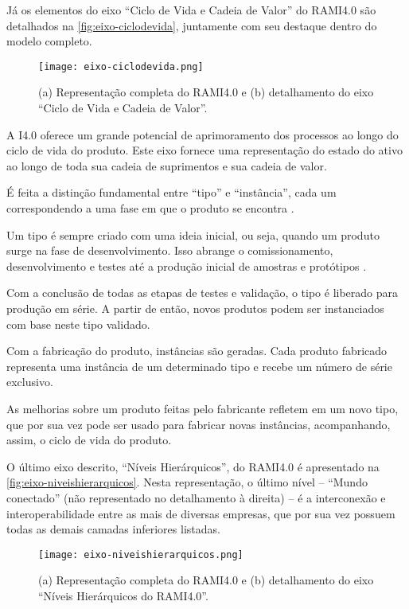 	Já os elementos do eixo ``Ciclo de Vida e Cadeia de Valor'' do RAMI4.0 são detalhados na \autoref{fig:eixo-ciclodevida}, juntamente com seu destaque dentro do modelo completo.
	
	\begin{figure}[htb]
		\centering
		\caption{(a) Representação completa do RAMI4.0 e (b) detalhamento do eixo ``Ciclo de Vida e Cadeia de Valor''.}
		\label{fig:eixo-ciclodevida}
		\texttt{[image: eixo-ciclodevida.png]}
	\end{figure}

	A I4.0 oferece um grande potencial de aprimoramento dos processos ao longo do ciclo de vida do produto. Este eixo fornece uma representação do estado do ativo ao longo de toda sua cadeia de suprimentos e sua cadeia de valor. 
	
	É feita a distinção fundamental entre ``tipo'' e ``instância'', cada um correspondendo a uma fase em que o produto se encontra \cite{adolphs2015rami}.
	
	Um tipo é sempre criado com uma ideia inicial, ou seja, quando um produto surge na fase de desenvolvimento. Isso abrange o comissionamento, desenvolvimento e testes até a produção inicial de amostras e protótipos \cite{adolph2018roadmap}. 
	
	Com a conclusão de todas as etapas de testes e validação, o tipo é liberado para produção em série. A partir de então, novos produtos podem ser instanciados com base neste tipo validado. 
	
	Com a fabricação do produto, instâncias são geradas. Cada produto fabricado representa uma instância de um determinado tipo e recebe um número de série exclusivo.
	
	As melhorias sobre um produto feitas pelo fabricante refletem em um novo tipo, que por sua vez pode ser usado para fabricar novas instâncias, acompanhando, assim, o ciclo de vida do produto.

	O último eixo descrito, ``Níveis Hierárquicos'', do RAMI4.0 é apresentado na \autoref{fig:eixo-niveishierarquicos}. Nesta representação, o último nível -- ``Mundo conectado'' (não representado no detalhamento à direita) -- é a interconexão e interoperabilidade entre as mais de diversas empresas, que por sua vez possuem todas as demais camadas inferiores listadas.
	
	\begin{figure}[htb]
		\centering
		\caption{(a) Representação completa do RAMI4.0 e (b) detalhamento do eixo ``Níveis Hierárquicos do RAMI4.0''.}
		\label{fig:eixo-niveishierarquicos}
		\texttt{[image: eixo-niveishierarquicos.png]}
	\end{figure}

